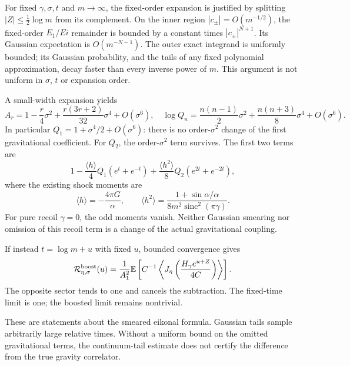 \documentclass[11pt,a4paper]{article}
\newcommand{\E}{\mathbb E}
\begin{document}
For fixed $\gamma,\sigma,t$ and $m\to\infty$, the fixed-order expansion
is justified by splitting $|Z|\le\tfrac12\log m$ from its complement.
On the inner region $|c_\pm|=O(m^{-1/2})$, the fixed-order $E_1/Ei$
remainder is bounded by a constant times $|c_\pm|^{N+1}$.
Its Gaussian expectation is $O(m^{-N-1})$.
The outer exact integrand is uniformly bounded; its Gaussian
probability, and the tails of any fixed polynomial approximation,
decay faster than every inverse power of $m$.
This argument is not uniform in $\sigma$, $t$ or expansion order.

A small-width expansion yields
\[
 A_r=1-\frac r4\sigma^2+\frac{r(3r+2)}{32}\sigma^4+O(\sigma^6),
 \quad
 \log Q_n=\frac{n(n-1)}2\sigma^2+\frac{n(n+3)}8\sigma^4+O(\sigma^6).
\]
In particular $Q_1=1+\sigma^4/2+O(\sigma^6)$: there is no
order-$\sigma^2$ change of the first gravitational coefficient.
For $Q_2$, the order-$\sigma^2$ term survives.
The first two terms are
\[
 1-\frac{\langle h\rangle}{4}Q_1(e^t+e^{-t})
   +\frac{\langle h^2\rangle}{8}Q_2(e^{2t}+e^{-2t}),
\]
where the existing shock moments are
\[
 \langle h\rangle=-\frac{4\pi G}{\alpha},\qquad
 \langle h^2\rangle=\frac{1+\sin\alpha/\alpha}
                     {8m^2\operatorname{sinc}^2(\pi\gamma)} .
\]
For pure recoil $\gamma=0$, the odd moments vanish. Neither
Gaussian smearing nor omission of this recoil term is a change of
the actual gravitational coupling.

If instead $t=\log m+u$ with fixed $u$, bounded convergence gives
\[
 {\cal R}_{\eta,\sigma}^{\rm boost}(u)
 =\frac1{A_1^2}\E\left[C^{-1}
  \left\langle J_\eta\left(\frac{H_\gamma e^{u+Z}}{4C}\right)
  \right\rangle\right].
\]
The opposite sector tends to one and cancels the subtraction.
The fixed-time limit is one; the boosted limit remains nontrivial.

These are statements about the smeared eikonal formula. Gaussian
tails sample arbitrarily large relative times. Without a uniform
bound on the omitted gravitational terms, the continuum-tail estimate
does not certify the difference from the true gravity correlator.

\newpage
\end{document}
